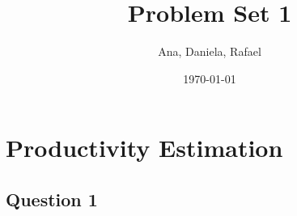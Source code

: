 \documentclass[11pt]{article}
\title{Problem Set 1}
\author{Ana, Daniela, Rafael}
\date{\today}
\begin{document}
\maketitle

\section*{Productivity Estimation}

\subsection*{Question 1} \label{q1}

\end{document}

